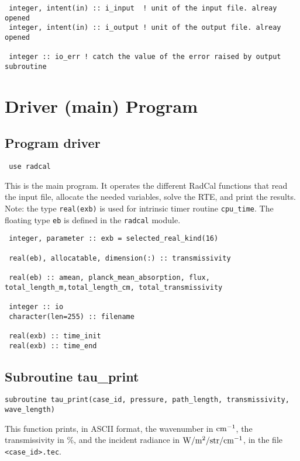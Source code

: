 \begin{lstlisting}
 integer, intent(in) :: i_input  ! unit of the input file. alreay opened
 integer, intent(in) :: i_output ! unit of the output file. alreay opened

 integer :: io_err ! catch the value of the error raised by output subroutine
\end{lstlisting}

\section{Driver (main) Program}
\subsection{Program driver}
\label{prog:driver}


\begin{lstlisting}
 use radcal

\end{lstlisting}

This is the main program. It operates the different RadCal functions that read the input file, allocate the needed variables, solve the RTE, and print the results. Note: the type \verb=real(exb)= is used for intrinsic timer routine \verb=cpu_time=. The floating type \verb=eb= is defined in the \verb=radcal= module.

\begin{lstlisting}
 integer, parameter :: exb = selected_real_kind(16)

 real(eb), allocatable, dimension(:) :: transmissivity

 real(eb) :: amean, planck_mean_absorption, flux, total_length_m,total_length_cm, total_transmissivity

 integer :: io
 character(len=255) :: filename

 real(exb) :: time_init
 real(exb) :: time_end
\end{lstlisting}

\subsection{Subroutine tau\_print}
\label{sub:tau_print}

\begin{lstlisting}
subroutine tau_print(case_id, pressure, path_length, transmissivity, wave_length)
\end{lstlisting}
This function prints, in ASCII format, the wavenumber in $\rm cm^{-1}$, the transmissivity in \%, and the incident radiance in $\rm W/m^{2}/str/cm^{-1}$, in the file \verb=<case_id>.tec=.

